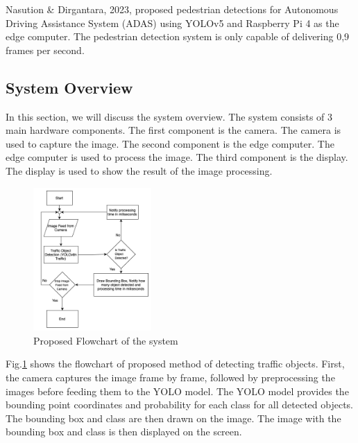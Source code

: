 \documentclass[conference]{IEEEtran}
\begin{document}
Nasution \& Dirgantara, 2023, proposed pedestrian detections for Autonomous Driving Assistance System (ADAS) using YOLOv5 and Raspberry Pi 4 as the edge computer. The pedestrian detection system is only capable of delivering 0,9 frames per second\cite{nasution2023pedestrian}.

\subsection{System Overview}
In this section, we will discuss the system overview. The system consists of 3 main hardware components. 
The first component is the camera. The camera is used to capture the image.
The second component is the edge computer. The edge computer is used to process the image. 
The third component is the display. The display is used to show the result of the image processing.
\begin{figure}[!ht]
\centering
\includegraphics[width=0.4\textwidth,keepaspectratio]{Proposed Flowchart.png}
\caption{Proposed Flowchart of the system}
\label{fig:flowchart}
\end{figure}


Fig.\ref{fig:flowchart} shows the flowchart of proposed method of detecting traffic objects. First, the camera captures the image frame by frame, followed by preprocessing the images before feeding them to the YOLO model. The YOLO model provides the bounding point coordinates and probability for each class for all detected objects. The bounding box and class are then drawn on the image. The image with the bounding box and class is then displayed on the screen.
\end{document}
